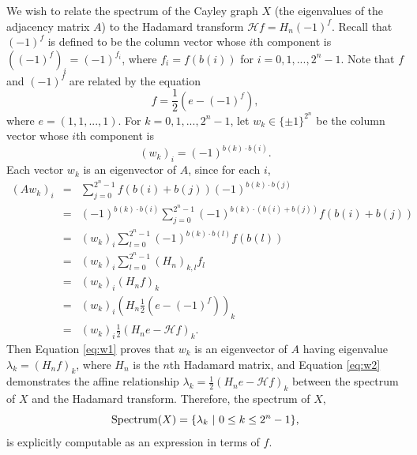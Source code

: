 \documentclass[12pt]{article}
\newcommand{\Hcal}{{\mathcal{H}}}
\newcommand{\onef}{(-1)^f}
\begin{document}
We wish to relate the spectrum of the Cayley graph $X$ (the eigenvalues of the adjacency matrix $A$) to the Hadamard transform $\mathcal H f = 
H_n (-1)^f$.  Recall that $(-1)^f$ is defined to be the column vector whose 
$i$th component is $((-1)^f)_i=(-1)^{f_i}$, where $f_i=f(b(i))$ for 
$i = 0, 1, ... , 2^n-1$.  Note that $f$ and $(-1)^f$ are related by the 
equation 
$$f=\frac 1 2 (e - (-1)^f),$$
where $e=(1,1,...,1)$.  
For $k=0, 1, ... , 2^n-1$, let $w_k\in \{\pm 1\}^{2^n}$ be the column vector whose
$i$th component is
\[
(w_k)_i = (-1)^{b(k)\cdot b(i)}.
\]
Each vector $w_k$ is an eigenvector of $A$, since for 
each $i$, 
\begin{eqnarray}
\nonumber (Aw_k)_i & =& \sum_{j=0}^{2^n-1} f(b(i)+b(j))(-1)^{b(k) \cdot b(j)}\\
\nonumber & =& (-1)^{b(k) \cdot b(i)} \sum_{j=0}^{2^n-1}(-1)^{b(k) \cdot (b(i)+b(j))} f(b(i)+b(j)) \\
\nonumber & =& (w_k)_i \sum_{l=0}^{2^n-1} (-1)^{b(k) \cdot b(l)}f(b(l))\\
\nonumber & =& (w_k)_i \sum_{l=0}^{2^n-1} (H_n)_{k,l} f_l\\
\label{eq:w1} & =& (w_k)_i (H_n f)_k \\
\nonumber  & =& (w_k)_i (H_n \frac 1 2 (e - \onef))_k\\
\label{eq:w2} & =& (w_k)_i \frac{1}{2} (H_n e - \Hcal f)_k.
\end{eqnarray}
Then Equation \eqref{eq:w1} proves that $w_k$ is an eigenvector of $A$ having eigenvalue
$\lambda_k = (H_n f)_k$, where $H_n$ is the $n$th Hadamard matrix, 
 and Equation \eqref{eq:w2} demonstrates the
affine relationship $\lambda_k =  \frac 1 2 (H_n e - \mathcal H f)_k$ between the spectrum of $X$ and the Hadamard transform.
Therefore, the spectrum of $X$,
\[
{\rm Spectrum}(X) = \{\lambda_k\ |\ 0\leq k\leq 2^n-1\},
\]
is explicitly computable as an expression in terms of $f$.
\end{document}

